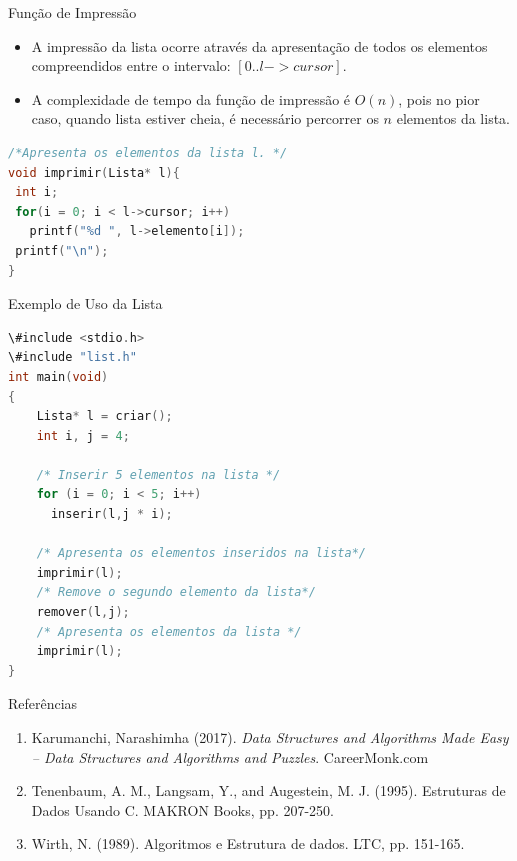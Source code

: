 \begin{frame}[fragile]{Função de Impressão}

\begin{itemize}
		\item A impressão da lista ocorre através da apresentação de todos os elementos compreendidos entre o intervalo: $[0.. l->cursor]$.
		\item A complexidade de tempo da função de impressão é $O(n)$, pois no pior caso, quando lista estiver cheia, é necessário percorrer os $n$ elementos da lista.
	
	\end{itemize}
	
\begin{lstlisting}[language=C]
/*Apresenta os elementos da lista l. */
void imprimir(Lista* l){
 int i;
 for(i = 0; i < l->cursor; i++)
   printf("%d ", l->elemento[i]);
 printf("\n");  
}
\end{lstlisting}	
\end{frame}

\begin{frame}[fragile,c]{Exemplo de Uso da Lista}

\begin{lstlisting}[language=C]
\#include <stdio.h>
\#include "list.h"
int main(void)
{
    Lista* l = criar();
    int i, j = 4;
    
    /* Inserir 5 elementos na lista */
    for (i = 0; i < 5; i++)
      inserir(l,j * i);
    
    /* Apresenta os elementos inseridos na lista*/    
    imprimir(l);
    /* Remove o segundo elemento da lista*/
    remover(l,j);
    /* Apresenta os elementos da lista */    
    imprimir(l);        
}
\end{lstlisting}

\end{frame} 


\begin{frame}{Referências}
	\begin{enumerate}
	\item Karumanchi, Narashimha (2017). 
	\textit{Data Structures and Algorithms Made Easy -- Data Structures and Algorithms
		and Puzzles}.  CareerMonk.com

\item Tenenbaum, A. M., Langsam, Y., and Augestein, M. J. (1995). Estruturas de Dados Usando C. MAKRON Books, pp. 207-250.
\item Wirth, N. (1989). Algoritmos e Estrutura de dados. LTC, pp. 151-165.
	\end{enumerate}
\end{frame}
